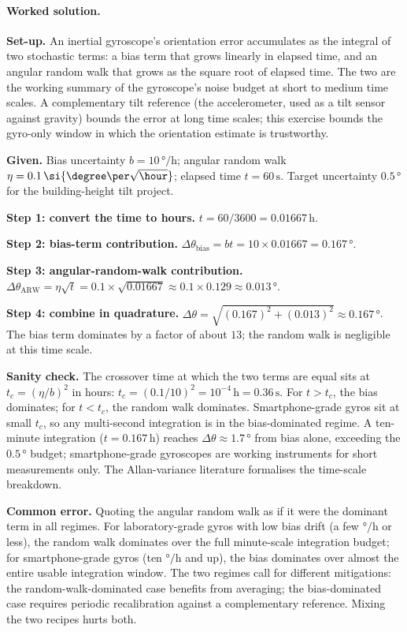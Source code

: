 \paragraph{Worked solution.}
\textbf{Set-up.} An inertial gyroscope's orientation error
accumulates as the integral of two stochastic terms: a bias
term that grows linearly in elapsed time, and an angular random
walk that grows as the square root of elapsed time. The two are
the working summary of the gyroscope's noise budget at short to
medium time scales. A complementary tilt reference (the
accelerometer, used as a tilt sensor against gravity) bounds the
error at long time scales; this exercise bounds the gyro-only
window in which the orientation estimate is trustworthy.

\textbf{Given.} Bias uncertainty $b = 10 \,\si{\degree\per\hour}$;
angular random walk $\eta = 0.1 \,\si{\degree\per\sqrt{\hour}}$;
elapsed time $t = 60 \,\si{\second}$. Target uncertainty
$0.5 \,\si{\degree}$ for the building-height tilt project.

\textbf{Step 1: convert the time to hours.}
$t = 60/3600 = 0.01667 \,\si{\hour}$.

\textbf{Step 2: bias-term contribution.}
$\Delta \theta_{\text{bias}} = b t = 10 \times 0.01667 = 0.167 \,\si
{\degree}$.

\textbf{Step 3: angular-random-walk contribution.}
$\Delta \theta_{\text{ARW}} = \eta \sqrt{t} = 0.1 \times
\sqrt{0.01667} \approx 0.1 \times 0.129 \approx 0.013 \,\si
{\degree}$.

\textbf{Step 4: combine in quadrature.}
$\Delta \theta = \sqrt{(0.167)^{2} + (0.013)^{2}} \approx 0.167
\,\si{\degree}$. The bias term dominates by a factor of about
$13$; the random walk is negligible at this time
scale.

\textbf{Sanity check.} The crossover time at which the two terms
are equal sits at $t_{c} = (\eta/b)^{2}$ in hours: $t_{c} =
(0.1/10)^{2} = 10^{-4} \,\si{\hour} = 0.36 \,\si{\second}$. For
$t > t_{c}$, the bias dominates; for $t < t_{c}$, the random walk
dominates. Smartphone-grade gyros sit at small $t_{c}$, so any
multi-second integration is in the bias-dominated regime. A
ten-minute integration ($t = 0.167 \,\si{\hour}$) reaches
$\Delta \theta \approx 1.7 \,\si{\degree}$ from bias alone,
exceeding the $0.5 \,\si{\degree}$ budget; smartphone-grade
gyroscopes are working instruments for short measurements only.
The Allan-variance literature \cite{paper:ch05-allan-1966}
formalises the time-scale breakdown.

\textbf{Common error.} Quoting the angular random walk as if it
were the dominant term in all regimes. For laboratory-grade gyros
with low bias drift (a few $\si{\degree\per\hour}$ or less), the
random walk dominates over the full minute-scale integration
budget; for smartphone-grade gyros (ten $\si{\degree\per\hour}$
and up), the bias dominates over almost the entire usable
integration window. The two regimes call for different
mitigations: the random-walk-dominated case benefits from
averaging; the bias-dominated case requires periodic
recalibration against a complementary reference. Mixing the two
recipes hurts both.

